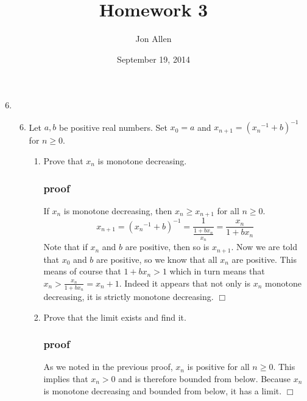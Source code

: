 \documentclass[letterpaper]{article}
\begin{document}
\title{Homework 3}
\date{September 19, 2014}
\author{Jon Allen}
\maketitle
\renewcommand{\labelenumi}{2.\arabic{enumi}}
\renewcommand{\labelenumii}{\Alph{enumii}.}
\renewcommand{\labelenumiii}{(\alph{enumiii})}
\begin{enumerate}
\setcounter{enumi}{5}
\item
  \begin{enumerate}
  \setcounter{enumii}{5}
  \item
  Let $a,b$ be positive real numbers. Set $x_0=a$ and $x_{n+1}=({x_n}^{-1}+b)^{-1}$ for $n\ge0$.
    \begin{enumerate}
    \item
    Prove that $x_n$ is monotone decreasing.
    \subsubsection*{proof}
    If $x_n$ is monotone decreasing, then $x_n\ge x_{n+1}$ for all $n\ge0$.
    \[
      x_{n+1}=({x_n}^{-1}+b)^{-1}
      =\frac{1}{\frac{1+bx_n}{x_n}}
      =\frac{x_n}{1+bx_n}
    \]
    Note that if $x_n$ and $b$ are positive, then so is $x_{n+1}$.
    Now we are told that $x_0$ and $b$ are positive, so we know that all $x_n$ are positive.
    This means of course that $1+bx_n>1$ which in turn means that $x_n>\frac{x_n}{1+bx_n}=x_  n+1$. Indeed it appears that not only is $x_n$ monotone decreasing, it is strictly monotone decreasing.
    $\Box$
    \item
    Prove that the limit exists and find it.
    \subsubsection*{proof}
    As we noted in the previous proof, $x_n$ is positive for all $n\ge0$. This implies that $x_n>0$ and is therefore bounded from below.
    Because $x_n$ is monotone decreasing and bounded from below, it has a limit.
    $\Box$

\end{enumerate}
\end{enumerate}
\end{enumerate}
\end{document}
